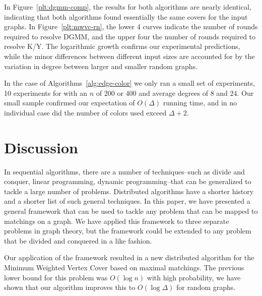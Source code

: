 \documentclass[conference, 10pt, letter]{IEEEtran}
\begin{document}
In Figure~\ref{plt:dgmm-comp}, the results for both algorithms are nearly identical, indicating that both algorithms found essentially the same covers for the input graphs. In Figure~\ref{plt:mwvc-rn}, the lower 4 curves indicate the number of rounds required to resolve DGMM, and the upper four the number of rounds required to resolve K/Y. The logarithmic growth confirms our experimental predictions, while the minor differences between different input sizes are accounted for by the variation in degree between larger and smaller random graphs.

In the case of Algorithms~\ref{alg:edge-color} we only ran a small set of experiments, 10 experiments for with an $n$ of 200 or 400 and average degrees of 8 and 24. Our small sample confirmed our expectation of $O(\Delta)$ running time, and in no individual case did the number of colors used exceed $\Delta + 2$.

\section{Discussion}

In sequential algorithms, there are a number of techniques--such as divide and conquer, linear programming, dynamic programming--that can be generalized to tackle a large number of problems. Distributed algorithms have a shorter history and a shorter list of such general techniques. In this paper, we have presented a general framework that can be used to tackle any problem that can be mapped to matchings on a graph. We have applied this framework to three separate problems in graph theory, but the framework could be extended to any problem that be divided and conquered in a like fashion. 

Our application of the framework resulted in a new distributed algorithm for the Minimum Weighted Vertex Cover based on maximal matchings. The previous lower bound for this problem was $O(\log n)$ with high probability, we have shown that our algorithm improves this to $O(\log \Delta)$ for random graphs. 



\end{document}
